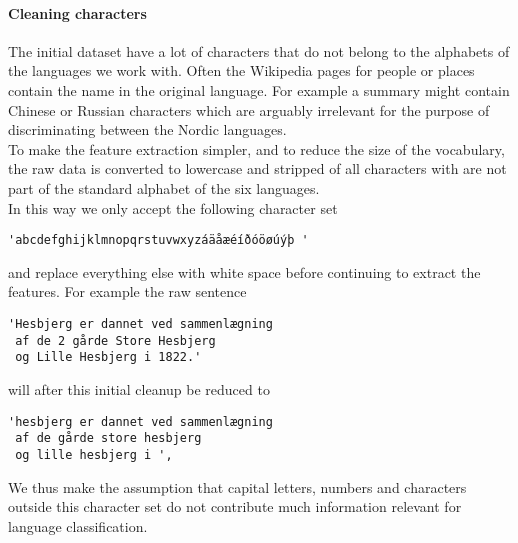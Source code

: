 \paragraph{Cleaning characters}
The initial dataset have a lot of characters that do not belong to the alphabets of the languages we work with. Often the Wikipedia pages for people or places contain the name in the original language. For example a summary might contain Chinese or Russian characters which are arguably irrelevant for the purpose of discriminating between the Nordic languages.\\

To make the feature extraction simpler, and to reduce the size of the vocabulary, the raw data is converted to lowercase and stripped of all characters with are not part of the standard alphabet of the six languages.\\

In this way we only accept the following character set
\begin{verbatim}
'abcdefghijklmnopqrstuvwxyzáäåæéíðóöøúýþ '
\end{verbatim}
and replace everything else with white space before continuing to extract the features.
For example the raw sentence
\begin{verbatim}
'Hesbjerg er dannet ved sammenlægning
 af de 2 gårde Store Hesbjerg
 og Lille Hesbjerg i 1822.'
\end{verbatim}
will after this initial cleanup be reduced to
\begin{verbatim}
'hesbjerg er dannet ved sammenlægning
 af de gårde store hesbjerg
 og lille hesbjerg i ',
\end{verbatim}

We thus make the assumption that capital letters, numbers and characters outside this character set do not contribute much information relevant for language classification.\\
